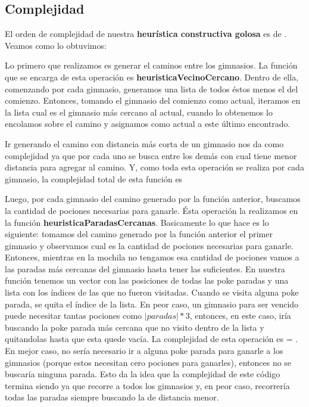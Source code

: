 \subsection{Complejidad}

El orden de complejidad de nuestra \textbf{heurística constructiva golosa} es de . Veamos como lo obtuvimos:

Lo primero que realizamos es generar el caminos entre los gimnasios. La función que se encarga de esta operación es \textbf{heuristicaVecinoCercano}. Dentro de ella, comenzando por cada gimnasio, generamos una lista de todos éstos menos el del comienzo. Entonces, tomando el gimnasio del comienzo como actual, iteramos en la lista cual es el gimnasio más cercano al actual, cuando lo obtenemos lo encolamos sobre el camino y asignamos como actual a este último encontrado.

Ir generando el camino con distancia más corta de un gimnasio nos da como complejidad  ya que por cada uno se busca entre los demás con cual tiene menor distancia para agregar al camino. Y, como toda esta operación se realiza por cada gimnasio, la complejidad total de esta función es 

Luego, por cada gimnasio del camino generado por la función anterior, buscamos la cantidad de pociones necesarias para ganarle. Ésta operación la realizamos en la función \textbf{heuristicaParadasCercanas}. Basicamente lo que hace es lo siguiente: tomamos del camino generado por la función anterior el primer gimnasio y observamos cual es la cantidad de pociones necesarias para ganarle. Entonces, mientras en la mochila no tengamos esa cantidad de pociones vamos a las paradas más cercanas del gimnasio hasta tener las suficientes. En nuestra función tenemos un vector con las posiciones de todas las poke paradas y una lista con los índices de las que no fueron visitadas. Cuando se visita alguna poke parada, se quita el índice de la lista. En peor caso, un gimnasio para ser vencido puede necesitar tantas pociones como $|paradas|*3$, entonces, en este caso, iría buscando la poke parada más cercana que no visito dentro de la lista y quitandolas hasta que esta quede vacía. La complejidad de esta operación es  = . En mejor caso, no sería necesario ir a alguna poke parada para ganarle a los gimnasios (porque estos necesitan cero pociones para ganarles), entonces no se buscaría ninguna parada. 
Esto da la idea que la complejidad de este código termina siendo  ya que recorre a todos los gimnasios y, en peor caso, recorrería todas las paradas siempre buscando la de distancia menor.

